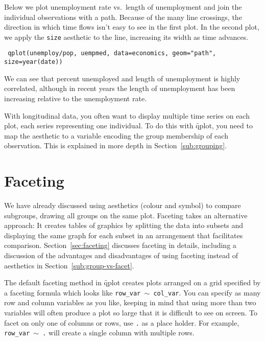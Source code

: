 Below we plot unemployment rate vs.\ length of unemployment and join the individual observations with a path.  Because of the many line crossings, the direction in which time flows isn't easy to see in the first plot.  In the second plot, we apply the {\tt size} aesthetic to the line, increasing its width as time advances.

{\tt
qplot(unemploy/pop, uempmed, data=economics, geom="path", size=year(date))
}

We can see that percent unemployed and length of unemployment is highly correlated, although in recent years the length of unemployment has been increasing relative to the unemployment rate.

% 


With longitudinal data, you often want to display multiple time series on each plot, each series representing one individual.  To do this with \f{qplot}, you need to map the  aesthetic to a variable encoding the group membership of each observation. This is explained in more depth in Section~\ref{sub:grouping}.

\section{Faceting}\label{sec:qplot-faceting}

We have already discussed using aesthetics (colour and symbol) to compare subgroups, drawing all groups on the same plot. Faceting takes an alternative approach: It creates tables of graphics by splitting the data into subsets and displaying the same graph for each subset in an arrangement that facilitates comparison. Section~\ref{sec:faceting} discusses faceting in details, including a discussion of the advantages and disadvantages of using faceting instead of aesthetics in Section~\ref{sub:group-vs-facet}.

The default faceting method in \f{qplot} creates plots arranged on a grid specified by a faceting formula which looks like {\tt row\_var $\sim$ col\_var}.  You can specify as many row and column variables as you like, keeping in mind that using more than two variables will often produce a plot so large that it is difficult to see on screen.  To facet on only one of columns or rows, use {\tt .} as a place holder.  For example, {\tt row\_var $\sim$ .} will create a single column with multiple rows.

